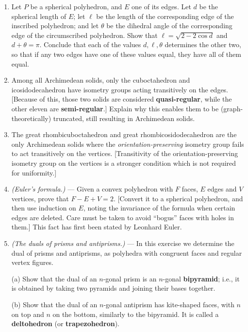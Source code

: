 \documentclass[leqno]{book}
\begin{document}
\begin{enumerate}
\item Let $P$ be a spherical polyhedron, and $E$ one of its edges.  Let $d$ be the spherical length of $E$; let $\ell$ be the length of the corresponding edge of the inscribed polyhedron; and let $\theta$ be the dihedral angle of the corresponding edge of the circumscribed polyhedron.  Show that $\ell=\sqrt{2-2\cos d}$ and $d+\theta=\pi$.  Conclude that each of the values $d,\ell,\theta$ determines the other two, so that if any two edges have one of these values equal, they have all of them equal.

\item Among all Archimedean solids, only the cuboctahedron and icosidodecahedron have isometry groups acting transitively on the edges.  [Because of this, those two solids are considered \textbf{quasi-regular}, while the other eleven are \textbf{semi-regular}.]  Explain why this enables them to be (graph-theoretically) truncated, still resulting in Archimedean solids.

\item The great rhombicuboctahedron and great rhombicosidodecahedron are the only Archimedean solids where the \emph{orientation-preserving} isometry group fails to act transitively on the vertices.  [Transitivity of the orientation-preserving isometry group on the vertices is a stronger condition which is not required for uniformity.]

\item\emph{(Euler's formula.)} \---- Given a convex polyhedron with $F$ faces, $E$ edges and $V$ vertices, prove that $F-E+V=2$. [Convert it to a spherical polyhedron, and then use induction on $E$, noting the invariance of the formula when certain edges are deleted.  Care must be taken to avoid ``bogus'' faces with holes in them.]  This fact has first been stated by Leonhard Euler.

\item\emph{(The duals of prisms and antiprisms.)} \---- In this exercise we determine the dual of prisms and antiprisms, as polyhedra with congruent faces and regular vertex figures.

(a) Show that the dual of an $n$-gonal prism is an $n$-gonal \textbf{bipyramid}; i.e., it is obtained by taking two pyramids and joining their bases together.

(b) Show that the dual of an $n$-gonal antiprism has kite-shaped faces, with $n$ on top and $n$ on the bottom, similarly to the bipyramid.  It is called a \textbf{deltohedron} (or \textbf{trapezohedron}).


\end{enumerate}
\end{document}
